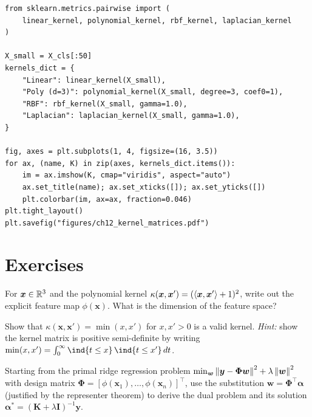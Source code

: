 \begin{codeblock}[title=\textbf{Visualising Kernel Matrices}]
\begin{verbatim}
from sklearn.metrics.pairwise import (
    linear_kernel, polynomial_kernel, rbf_kernel, laplacian_kernel
)

X_small = X_cls[:50]
kernels_dict = {
    "Linear": linear_kernel(X_small),
    "Poly (d=3)": polynomial_kernel(X_small, degree=3, coef0=1),
    "RBF": rbf_kernel(X_small, gamma=1.0),
    "Laplacian": laplacian_kernel(X_small, gamma=1.0),
}

fig, axes = plt.subplots(1, 4, figsize=(16, 3.5))
for ax, (name, K) in zip(axes, kernels_dict.items()):
    im = ax.imshow(K, cmap="viridis", aspect="auto")
    ax.set_title(name); ax.set_xticks([]); ax.set_yticks([])
    plt.colorbar(im, ax=ax, fraction=0.046)
plt.tight_layout()
plt.savefig("figures/ch12_kernel_matrices.pdf")
\end{verbatim}
\end{codeblock}

\section{Exercises}

\begin{exercise}
For $\bm{x}\in\mathbb{R}^3$ and the polynomial kernel $\kappa(\bm{x},\bm{x}')=(\langle \bm{x}, \bm{x}' \rangle+1)^2$, write out the explicit feature map $\phi(\bm{x})$. What is the dimension of the feature space?
\end{exercise}

\begin{exercise}
Show that $\kappa(\bm{x},\bm{x}')=\min(x,x')$ for $x,x'>0$ is a valid kernel. \emph{Hint:} show the kernel matrix is positive semi-definite by writing $\min(x,x')=\int_0^\infty\ind\{t\leq x\}\,\ind\{t\leq x'\}\,dt$.
\end{exercise}

\begin{exercise}
Starting from the primal ridge regression problem $\min_{\bm{w}}\left\| \bm{y}-\bm{\Phi}\bm{w} \right\|^2+\lambda\left\| \bm{w} \right\|^2$ with design matrix $\bm{\Phi}=[\phi(\bm{x}_1),\dots,\phi(\bm{x}_n)]^\top$, use the substitution $\bm{w}=\bm{\Phi}^\top\bm{\alpha}$ (justified by the representer theorem) to derive the dual problem and its solution $\bm{\alpha}^*=(\bm{K}+\lambda\bm{I})^{-1}\bm{y}$.
\end{exercise}

